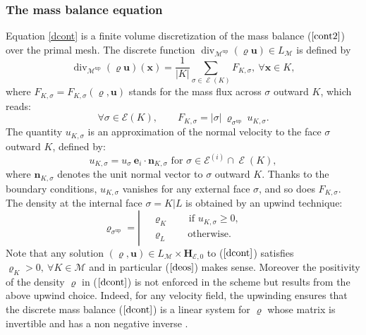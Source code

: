 \documentclass{amsart}
\numberwithin{equation}{section}
\begin{document}
\subsubsection{The mass balance equation}\label{massbalance}

Equation \eqref{dcont}  is a finite volume discretization of the mass balance ($\ref{cont2}$) over the primal mesh.  The discrete function $\operatorname{div}_{{\mathcal M}}^\operatorname{up} ({\varrho} {{\boldsymbol u}})  \in L_{{\mathcal M}}  $ is defined by
\begin{equation*}
\operatorname{div}_{{\mathcal M}}^\operatorname{up} ({\varrho} {{\boldsymbol u}}) ({{\boldsymbol x}}) = \frac{1}{|K|} \sum_{{{\sigma}} \in \operatorname{{\mathcal{E}}}(K)} F_{K,{{\sigma}}}, \ \forall {{\boldsymbol x}} \in K,
\end{equation*}
where $F_{K,{{\sigma}}} =F_{K,{{\sigma}}} ({\varrho},{{\boldsymbol u}})$ stands for the mass flux across ${{\sigma}}$ outward $K$, which reads:
\begin{equation}\label{eq:massflux}
\forall {{\sigma}} \in{{\mathcal E}}(K), \qquad F_{K,{{\sigma}}}= |{{\sigma}}| \ {\varrho}_{{\sigma}}^\operatorname{up}\ u_{K,{{\sigma}}}.
\end{equation}
The quantity $u_{K,{{\sigma}}}$ is an approximation of the normal velocity to the face ${{\sigma}}$ outward $K$, defined by:
\begin{equation}\label{eq:edge_velo}
u_{K,{{\sigma}}} =  u_{{\sigma}} \ {{\boldsymbol e}}_i \cdot {{\boldsymbol n}}_{K,{{\sigma}}}  \mbox{ for } {{\sigma}} \in {{\mathcal E}}{^{(i)}} \cap \operatorname{{\mathcal{E}}}(K),
\end{equation}
where ${{\boldsymbol n}}_{K,{{\sigma}}} $ denotes the unit normal vector to ${{\sigma}}$ outward $K$.
Thanks to the boundary conditions, $u_{K,{{\sigma}}}$ vanishes for any external face ${{\sigma}}$, and so does $F_{K,{{\sigma}}}$.
The density at the internal face ${{\sigma}}=K|L$ is obtained by an upwind technique:
\begin{equation}\label{eq:rho_upwind} 
{\varrho}_{{\sigma}}^\operatorname{up}=\left| \begin{aligned} &
{\varrho}_K \qquad \mbox{if } u_{K,{{\sigma}}} \geq 0,
\\[1ex] &
{\varrho}_L \qquad \mbox{otherwise}.
\end{aligned} \right. \qquad
\end{equation}
Note that any solution $({\varrho},{{\boldsymbol u}}) \in L_{{\mathcal M}} \times {{\mathbf{H}_{{{\mathcal E}},0}}} $ to ($\ref{dcont}$) satisfies $ {\varrho}_K > 0, \ \forall K \in {{\mathcal M}}$ and in particular ($\ref{deos}$) makes sense.
Moreover the positivity of the density ${\varrho}$ in ($\ref{dcont}$) is not enforced in the scheme but results from the above upwind choice.  Indeed, for any velocity field, the upwinding ensures that the discrete mass balance ($\ref{dcont}$) is a linear system for ${\varrho}$ whose matrix is invertible and has a non negative inverse \cite[ Lemma C.3]{fettah2012numerical}.
\end{document}
